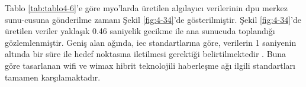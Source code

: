 Tablo \ref{tab:tablo4-6}’e göre \gls{myo}'larda üretilen algılayıcı verilerinin \gls{dpu} merkez sunu-cusuna gönderilme zamanı Şekil \ref{fig:4-34}’de gösterilmiştir. Şekil \ref{fig:4-34}’de üretilen veriler yaklaşık 0.46 saniyelik gecikme ile ana sunucuda toplandığı gözlemlenmiştir. Geniş alan ağında, \gls{iec} standartlarına göre, verilerin 1 saniyenin altında bir süre ile hedef noktasına iletilmesi gerektiği belirtilmektedir \cite{mackiewicz2006overview}. Buna göre tasarlanan \gls{wifi} ve \gls{wimax} hibrit teknolojili haberleşme ağı ilgili standartları tamamen karşılamaktadır.

